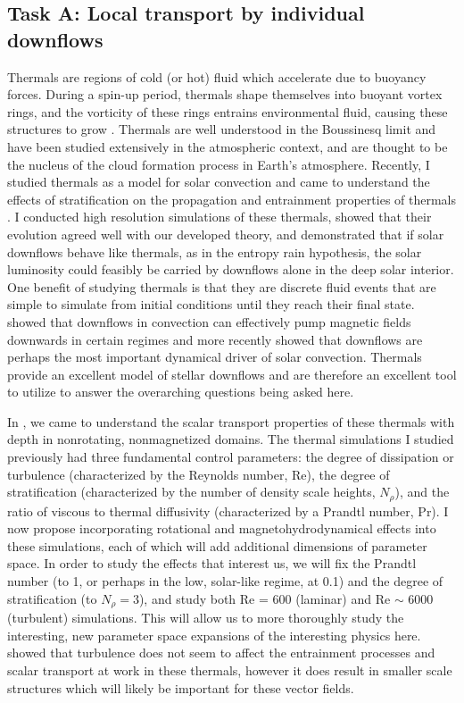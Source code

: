 \documentclass[aasms,12pt]{article}
\begin{document}
\subsection{Task A: Local transport by individual downflows}
Thermals are regions of cold (or hot) fluid which accelerate due to buoyancy forces.
During a spin-up period, thermals shape themselves into buoyant vortex rings, and the vorticity of these rings entrains environmental fluid, causing these structures to grow \citep{lecoanet&jeevanjee2019}.
Thermals are well understood in the Boussinesq limit and have been studied extensively in the atmospheric context, and are thought to be the nucleus of the cloud formation process in Earth's atmosphere.
Recently, I studied thermals as a model for solar convection and came to understand the effects of stratification on the propagation and entrainment properties of thermals \citep{andersLB2019}.
I conducted high resolution simulations of these thermals, showed that their evolution agreed well with our developed theory, and demonstrated that if solar downflows behave like thermals, as in the entropy rain hypothesis, the solar luminosity could feasibly be carried by downflows alone in the deep solar interior.
One benefit of studying thermals is that they are discrete fluid events that are simple to simulate from initial conditions until they reach their final state.
\citet{tobias&all1998} showed that downflows in convection can effectively pump magnetic fields downwards in certain regimes and more recently \citet{kapyla&all2017} showed that downflows are perhaps the most important dynamical driver of solar convection.
Thermals provide an excellent model of stellar downflows and are therefore an excellent tool to utilize to answer the overarching questions being asked here.

In \citet{andersLB2019}, we came to understand the scalar transport properties of these thermals with depth in nonrotating, nonmagnetized domains.
The thermal simulations I studied previously had three fundamental control parameters: the degree of dissipation or turbulence (characterized by the Reynolds number, Re), the degree of stratification (characterized by the number of density scale heights, $N_\rho$), and the ratio of viscous to thermal diffusivity (characterized by a Prandtl number, Pr).
I now propose incorporating rotational and magnetohydrodynamical effects into these simulations, each of which will add additional dimensions of parameter space.
In order to study the effects that interest us, we will fix the Prandtl number (to 1, or perhaps in the low, solar-like regime, at 0.1) and the degree of stratification (to $N_\rho = 3$), and study both Re = 600 (laminar) and Re $\sim$ 6000 (turbulent) simulations.
This will allow us to more thoroughly study the interesting, new parameter space expansions of the interesting physics here.
\citet{lecoanet&jeevanjee2019} showed that turbulence does not seem to affect the entrainment processes and scalar transport at work in these thermals, however it does result in smaller scale structures which will likely be important for these vector fields.
\end{document}
